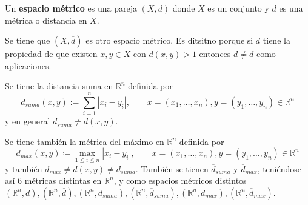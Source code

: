 \begin{defi}
    Un \textbf{espacio m\'etrico} es una pareja $(X, d)$ donde $X$ es un conjunto y $d$ es una m\'etrica o distancia en $X$.
\end{defi}
\begin{ejem}
    Se tiene que $(X, \overline{d})$ es otro espacio m\'etrico. Es ditsitno porque si $d$ tiene la propiedad de que existen $x,y\in X$ con $d(x,y) > 1$ entonces $\overline{d} \neq d$ como aplicaciones. 
\end{ejem}
\begin{ejem}
Se tiene la distancia suma en $\mathbb{R}^n$ definida por
\[  
    d_{suma}(x, y) := \sum_{i=1}^n |x_i - y_i|, \qquad x = (x_1, \ldots, x_n), y = (y_1, \ldots, y_n) \in \mathbb{R}^n
\]
y en general $d_{suma}\neq d(x,y)$.

Se tiene tambi\'en la m\'etrica del m\'aximo en $\mathbb{R}^n$ definida por
\[
    d_{max}(x, y) \coloneqq \max_{1 \le i \le n} |x_i - y_i|, \qquad x = (x_1, \ldots, x_n), y = (y_1, \ldots, y_n) \in \mathbb{R}^n
\] y tambi\'en $d_{max} \neq d(x,y) \neq d_{suma}$. Tambi\'en se tienen $\overline{d}_{suma}$ y $\overline{d}_{max}$, teni\'endose as\'i 6 m\'etricas distintas en $\mathbb{R}^n$, y como espacios m\'etricos distintos $(\mathbb{R}^n, d), (\mathbb{R}^n, \overline{d}), (\mathbb{R}^n, d_{suma}), (\mathbb{R}^n, \overline{d}_{suma}), (\mathbb{R}^n, d_{max}), (\mathbb{R}^n, \overline{d}_{max})$.
\end{ejem}
